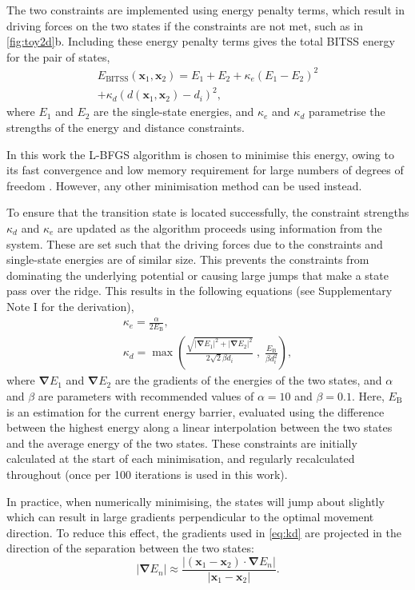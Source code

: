 \documentclass[twocolumn,10pt]{revtex4}
\newcommand{\bm}[1]{\boldsymbol{\mathbf{#1}}}
\newcommand{\abs}[1]{\left| #1 \right|}
\newcommand{\grad}{\bm{\nabla}}
\begin{document}
The two constraints are implemented using energy penalty terms, which result in driving forces on the two states if the constraints are not met, such as in \cref{fig:toy2d}b.
Including these energy penalty terms gives the total BITSS energy for the pair of states,
\begin{multline}\label{eq:bitss}
  E_\mathrm{BITSS}(\bm{x}_1, \bm{x}_2) = E_1 + E_2
    + \kappa_e \left( E_1 - E_2 \right) ^2 \\
    + \kappa_d \left( d(\bm{x}_1, \bm{x}_2) - d_i \right) ^2,
\end{multline}
where $E_1$ and $E_2$ are the single-state energies, and $\kappa_e$ and $\kappa_d$ parametrise the strengths of the energy and distance constraints.

In this work the L-BFGS algorithm is chosen to minimise this energy, owing to its fast convergence and low memory requirement for large numbers of degrees of freedom \cite{Liu1989}.
However, any other minimisation method can be used instead.

To ensure that the transition state is located successfully, the constraint strengths $\kappa_d$ and $\kappa_e$ are updated as the algorithm proceeds using information from the system.
These are set such that the driving forces due to the constraints and single-state energies are of similar size.
This prevents the constraints from dominating the underlying potential or causing large jumps that make a state pass over the ridge.
This results in the following equations (see Supplementary Note I for the derivation),
\begin{gather}
  \kappa_e = \frac {\alpha} {2 E_\mathrm{B}},
  \label{eq:ke}
  \\
  \kappa_d = \max \left(
    \frac {\sqrt{\abs{\grad E_1}^2 + \abs{\grad E_2}^2}} {2\sqrt{2} \beta d_i} \; , \;
    \frac{E_\mathrm{B}}{\beta d_i^2} \right),
  \label{eq:kd}
\end{gather}
where $\grad E_1$ and $\grad E_2$ are the gradients of the energies of the two states, and $\alpha$ and $\beta$ are parameters with recommended values of $\alpha = 10$ and $\beta = 0.1$.
Here, $E_\mathrm{B}$ is an estimation for the current energy barrier, evaluated using the difference between the highest energy along a linear interpolation between the two states and the average energy of the two states.
These constraints are initially calculated at the start of each minimisation, and regularly recalculated throughout (once per 100 iterations is used in this work).

In practice, when numerically minimising, the states will jump about slightly which can result in large gradients perpendicular to the optimal movement direction.
To reduce this effect, the gradients used in \cref{eq:kd} are projected in the direction of the separation between the two states:
\begin{equation}
  \abs{\grad E_n} \approx \frac {\abs{(\bm{x}_1 - \bm{x}_2) \cdot \grad E_n}} {\abs{\bm{x}_1 - \bm{x}_2}}.
\end{equation}
\end{document}
